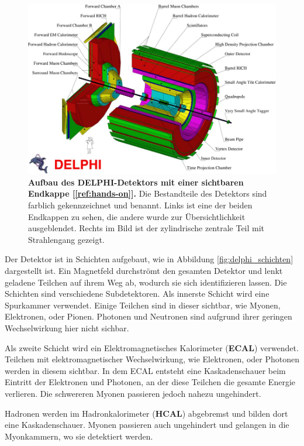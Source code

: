 \documentclass[a4paper,ngerman]{scrartcl}
\begin{document}
\begin{figure}[tbh!]
\centering
\includegraphics[width=\textwidth]{abbildungen/delphi_big.png}
\caption{\textbf{Aufbau des DELPHI-Detektors mit einer sichtbaren Endkappe [\ref{ref:hands-on}].} 
Die Bestandteile des Detektors sind farblich gekennzeichnet und benannt.
Links ist eine der beiden Endkappen zu sehen, die andere wurde zur Übersichtlichkeit ausgeblendet.
Rechts im Bild ist der zylindrische zentrale Teil mit Strahlengang gezeigt. 
}
\label{fig:delphi_big}
\end{figure}

Der Detektor ist in Schichten aufgebaut, wie in Abbildung \ref{fig:delphi_schichten} dargestellt ist.
Ein Magnetfeld durchströmt den gesamten Detektor und lenkt geladene Teilchen auf ihrem Weg ab, wodurch sie sich identifizieren lassen.
Die Schichten sind verschiedene Subdetektoren. 
Als innerste Schicht wird eine Spurkammer verwendet.
Einige Teilchen sind in dieser sichtbar, wie Myonen, Elektronen, oder Pionen.
Photonen und Neutronen sind aufgrund ihrer geringen Wechselwirkung hier nicht sichbar.

Als zweite Schicht wird ein Elektromagnetisches Kalorimeter (\textbf{ECAL}) verwendet.
Teilchen mit elektromagnetischer Wechselwirkung, wie Elektronen, oder Photonen werden in diesem sichtbar.
In dem ECAL entsteht eine Kaskadenschauer beim Eintritt der Elektronen und Photonen, an der diese Teilchen die gesamte Energie verlieren. 
Die schwereren Myonen passieren jedoch nahezu ungehindert.

Hadronen werden im Hadronkalorimeter (\textbf{HCAL}) abgebremst und bilden dort eine Kaskadenschauer.
Myonen passieren auch ungehindert und gelangen in die Myonkammern, wo sie detektiert werden.
\end{document}
